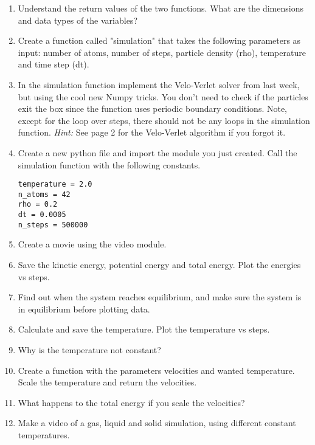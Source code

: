 \documentclass{article}
\begin{document}
\begin{enumerate}[resume]
    \item Understand the return values of the two functions.
        What are the dimensions and data types of the variables?

 
    \item Create a function called "simulation" that takes the following parameters as input:
        number of atoms,
        number of steps,
        particle density (rho),
        temperature and
        time step (dt).


    \item In the simulation function implement the Velo-Verlet solver from last week, but using the cool new Numpy tricks.
        You don't need to check if the particles exit the box since the  function uses periodic boundary conditions.
        Note, except for the loop over steps, there should not be any loops in the simulation function.
       {\em Hint:} See page 2 for the Velo-Verlet algorithm if you forgot it.


    \item Create a new python file and import the module you just created. Call the simulation function with the following constants.
\begin{lstlisting}
temperature = 2.0
n_atoms = 42
rho = 0.2
dt = 0.0005
n_steps = 500000
\end{lstlisting}


    \item Create a movie using the video module.

    \item Save the kinetic energy, potential energy and total energy.
        Plot the energies vs steps.

    \item Find out when the system reaches equilibrium, and make sure the system is in equilibrium before plotting data.

    \item Calculate and save the temperature.
        Plot the temperature vs steps.

    \item Why is the temperature not constant?

    \item Create a function  with the parameters velocities and wanted temperature.
        Scale the temperature and return the velocities.
        
    \item What happens to the total energy if you scale the velocities?

    \item Make a video of a gas, liquid and solid simulation, using different constant temperatures.

\end{enumerate}
\end{document}

